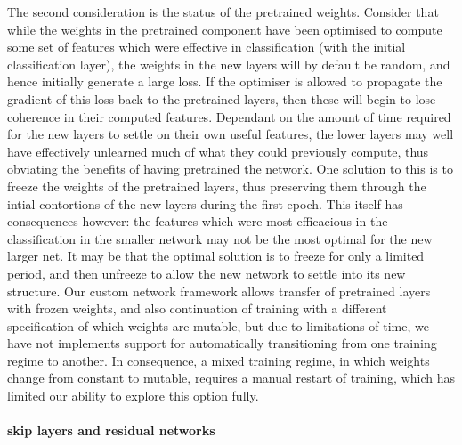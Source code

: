 \documentclass[msc]{infthesis}
\begin{document}
The second consideration is the status of the pretrained weights.  Consider that while the
weights in the pretrained component have been optimised to compute some set of features which
were effective in classification (with the initial classification layer), the weights in the new
layers will by default be random, and hence initially generate a large loss.  If the optimiser
is allowed to propagate the gradient of this loss back to the pretrained layers, then these will
begin to lose coherence in their computed features.  Dependant on the amount of time required
for the new layers to settle on their own useful features, the lower layers may well have
effectively unlearned much of what they could previously compute, thus obviating the benefits of
having pretrained the network.  One solution to this is to freeze the weights of the pretrained
layers, thus preserving them through the intial contortions of the new layers during the first
epoch.  This itself has consequences however: the features which were most efficacious in the
classification in the smaller network may not be the most optimal for the new larger net.  It
may be that the optimal solution is to freeze for only a limited period, and then unfreeze to
allow the new network to settle into its new structure.  Our custom network framework allows
transfer of pretrained layers with frozen weights, and also continuation of training with a
different specification of which weights are mutable, but due to limitations of time, we have
not implements support for automatically transitioning from one training regime to another.  In
consequence, a mixed training regime, in which weights change from constant to mutable, requires
a manual restart of training, which has limited our ability to explore this option fully.



\paragraph*{skip layers and residual networks}
\end{document}
